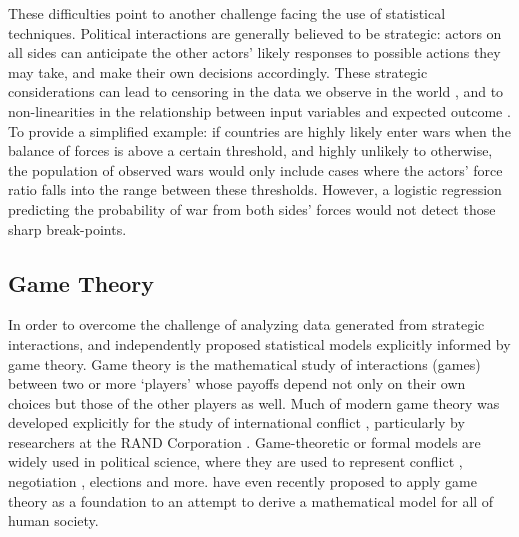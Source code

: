 These difficulties point to another challenge facing the use of statistical techniques. Political interactions are generally believed to be strategic: actors on all sides can anticipate the other actors' likely responses to possible actions they may take, and make their own decisions accordingly. These strategic considerations can lead to censoring in the data we observe in the world \citep{smith_1999}, and to non-linearities in the relationship between input variables and expected outcome \citep{signorino_1999}. To provide a simplified example: if countries are highly likely enter wars when the balance of forces is above a certain threshold, and highly unlikely to otherwise, the population of observed wars would only include cases where the actors' force ratio falls into the range between these thresholds. However, a logistic regression predicting the probability of war from both sides' forces would not detect those sharp break-points. 

\subsection*{Game Theory}\label{formal-game-theoretic-models}

In order to overcome the challenge of analyzing data generated from strategic interactions, \citet{signorino_1999} and \citet{smith_1999} independently proposed statistical models explicitly informed by game theory. Game theory is the mathematical study of interactions (games) between two or more `players' whose payoffs depend not only on their own choices but those of the other players as well. Much of modern game theory was developed explicitly for the study of international conflict \citep{myerson_2009}, particularly by researchers at the RAND Corporation \citep{gates_1997}. Game-theoretic or formal models are widely used in political science, where they are used to represent conflict \citep[e.g.][]{powell_2006}, negotiation \citep[e.g.][]{brams_2003}, elections \citep[e.g.][]{coughlin_1981} and more. \citet{gintis_2015} have even recently proposed to apply game theory as a foundation to an attempt to derive a mathematical model for all of human society.

